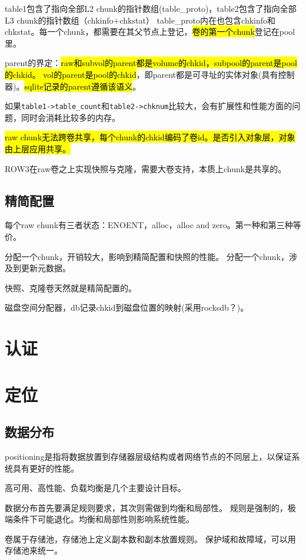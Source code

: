 table1包含了指向全部L2 chunk的指针数组(table\_proto)，table2包含了指向全部L3 chunk的指针数组（chkinfo+chkstat）
table\_proto内在也包含chkinfo和chkstat。每一个chunk，都需要在其父节点上登记，\hl{卷的第一个chunk}登记在pool里。

parent的界定：\hl{raw和subvol的parent都是volume的chkid，subpool的parent是pool的chkid。
vol的parent是pool的chkid}，即parent都是可寻址的实体对象(具有控制器)。\hl{sqlite记录的parent遵循该语义}。

如果\verb|table1->table_count|和\verb|table2->chknum|比较大，会有扩展性和性能方面的问题，同时会消耗比较多的内存。

\hl{raw chunk无法跨卷共享，每个chunk的chkid编码了卷id。是否引入对象层，对象由上层应用共享。}

ROW3在raw卷之上实现快照与克隆，需要大卷支持，本质上chunk是共享的。

\subsection{精简配置}

每个raw chunk有三者状态：ENOENT，alloc，alloc and zero。第一种和第三种等价。

分配一个chunk，开销较大，影响到精简配置和快照的性能。
分配一个chunk，涉及到更新元数据。

快照、克隆卷天然就是精简配置的。

磁盘空间分配器，db记录chkid到磁盘位置的映射(采用rocksdb？)。

\section{认证}

\section{定位}

\subsection{数据分布}

positioning是指将数据放置到存储器层级结构或者网络节点的不同层上，以保证系统具有更好的性能。

高可用、高性能、负载均衡是几个主要设计目标。

数据分布首先要满足规则要求，其次则需做到均衡和局部性。
规则是强制的，极端条件下可能退化。均衡和局部性则影响系统性能。

卷属于存储池，存储池上定义副本数和副本放置规则。
保护域和故障域，可以用存储池来统一。

